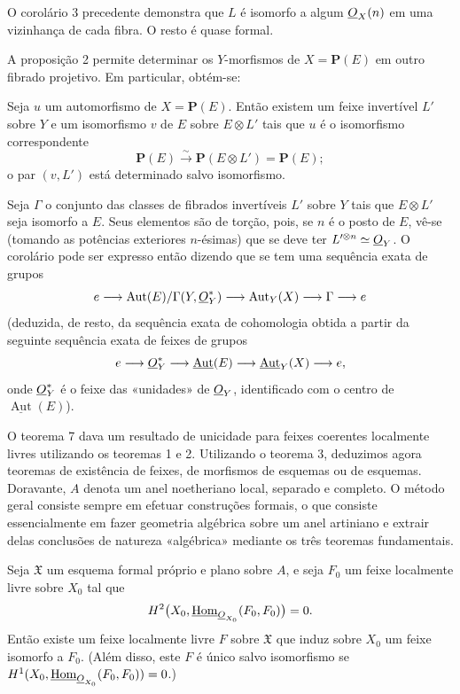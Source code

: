 O corolário 3 precedente demonstra que $L$ é isomorfo a algum $\underline{O}_X(n)$ em
uma vizinhança de cada fibra. O resto é quase formal.

A proposição 2 permite determinar os $Y$-morfismos de $X=\mathbf P(E)$ em
outro fibrado projetivo. Em particular, obtém-se:

 Seja $u$ um automorfismo de $X=\mathbf P(E)$. Então
existem um feixe invertível $L'$ sobre $Y$ e um isomorfismo $v$ de $E$ sobre
$E\otimes L'$ tais que $u$ é o isomorfismo correspondente
\[
  \mathbf P(E)\xrightarrow{\sim}\mathbf P(E\otimes L')=\mathbf P(E);
\]
o par $(v,L')$ está determinado salvo isomorfismo.

Seja $\Gamma$ o conjunto das classes de fibrados invertíveis $L'$ sobre $Y$
tais que $E\otimes L'$ seja isomorfo a $E$. Seus elementos são de torção, pois,
se $n$ é o posto de $E$, vê-se (tomando as potências exteriores $n$-ésimas)
que se deve ter $L'^{\otimes n}\simeq\underline{O}_Y$. O corolário pode ser expresso
então dizendo que se tem uma sequência exata de grupos
\[
  e\longrightarrow
  \operatorname{Aut}(E)/\Gamma(Y,\underline{O}_Y^*)
  \longrightarrow \operatorname{Aut}_Y(X)
  \longrightarrow \Gamma\longrightarrow e
\]
(deduzida, de resto, da sequência exata de cohomologia obtida a partir
da seguinte sequência exata de feixes de grupos
\[
  e\longrightarrow \underline{O}_Y^*
  \longrightarrow \underline{\operatorname{Aut}}(E)
  \longrightarrow \underline{\operatorname{Aut}}_Y(X)
  \longrightarrow e,
\]
onde $\underline{O}_Y^*$ é o feixe das «unidades» de $\underline{O}_Y$, identificado com o
centro de $\underline{\operatorname{Aut}}(E)$).


O teorema 7 dava um resultado de unicidade para feixes coerentes localmente
livres utilizando os teoremas 1 e 2. Utilizando o teorema 3, deduzimos agora
teoremas de existência de feixes, de morfismos de esquemas ou de esquemas.
Doravante, $A$ denota um anel noetheriano local, separado e completo. O método
geral consiste sempre em efetuar construções formais, o que consiste
essencialmente em fazer geometria algébrica sobre um anel artiniano e extrair
delas conclusões de natureza «algébrica» mediante os três teoremas
fundamentais.

 Seja $\mathfrak X$ um esquema formal próprio e plano
sobre $A$, e seja $F_0$ um feixe localmente livre sobre $X_0$ tal que
\[
  H^2\bigl(X_0,\underline{\operatorname{Hom}}_{\underline{O}_{X_0}}(F_0,F_0)\bigr)=0.
\]
Então existe um feixe localmente livre $F$ sobre $\mathfrak X$ que induz
sobre $X_0$ um feixe isomorfo a $F_0$. (Além disso, este $F$ é único salvo
isomorfismo se
$H^1(X_0,\underline{\operatorname{Hom}}_{\underline{O}_{X_0}}(F_0,F_0))=0$.)

